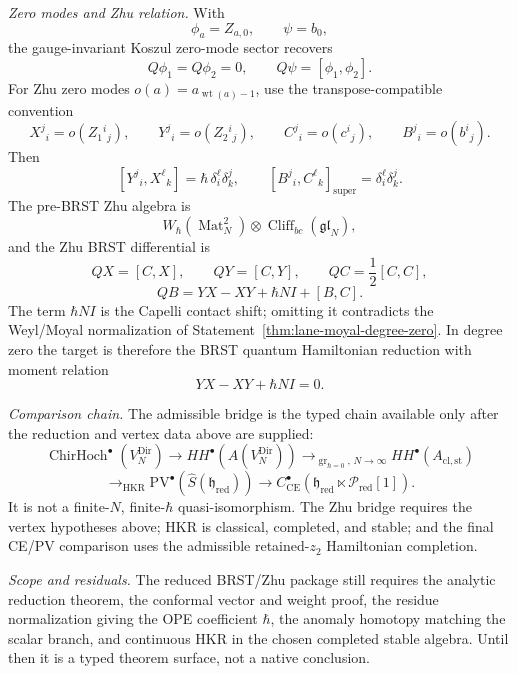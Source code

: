 \begin{stmt}
  \emph{Zero modes and Zhu relation.} With
  \[
    \phi_a=Z_{a,0},\qquad \psi=b_0,
  \]
  the gauge-invariant Koszul zero-mode sector recovers
  \[
    Q\phi_1=Q\phi_2=0,\qquad Q\psi=[\phi_1,\phi_2].
  \]
  For Zhu zero modes \(o(a)=a_{\operatorname{wt}(a)-1}\), use the
  transpose-compatible convention
  \[
    X^j{}_i=o(Z_1{}^i{}_j),\qquad
    Y^j{}_i=o(Z_2{}^i{}_j),\qquad
    C^j{}_i=o(c^i{}_j),\qquad
    B^j{}_i=o(b^i{}_j).
  \]
  Then
  \[
    [Y^j{}_i,X^\ell{}_k]
    =
    \hbar\,\delta^\ell_i\delta^j_k,\qquad
    [B^j{}_i,C^\ell{}_k]_{\mathrm{super}}
    =
    \delta^\ell_i\delta^j_k.
  \]
  The pre-BRST Zhu algebra is
  \[
    W_\hbar(\operatorname{Mat}_N^2)
    \otimes
    \operatorname{Cliff}_{bc}(\mathfrak{gl}_N),
  \]
  and the Zhu BRST differential is
  \[
    QX=[C,X],\qquad QY=[C,Y],\qquad
    QC=\frac12[C,C],
  \]
  \[
    QB=YX-XY+\hbar N I+[B,C].
  \]
  The term \(\hbar N I\) is the Capelli contact shift; omitting it
  contradicts the Weyl/Moyal normalization of
  Statement~\ref{thm:lane-moyal-degree-zero}.  In degree zero the target
  is therefore the BRST quantum Hamiltonian reduction with moment
  relation
  \[
    YX-XY+\hbar N I=0.
  \]

  \emph{Comparison chain.} The admissible bridge is the typed chain
  available only after the reduction and vertex data above are supplied:
  \[
    \operatorname{ChirHoch}^\bullet(V_N^{\mathrm{Dir}})
    \longrightarrow
    HH^\bullet(A(V_N^{\mathrm{Dir}}))
    \longrightarrow_{\operatorname{gr}_{\hbar=0},\,N\to\infty}
    HH^\bullet(A_{\mathrm{cl,st}})
  \]
  \[
    \longrightarrow_{\mathrm{HKR}}
    \mathrm{PV}^\bullet(\widehat S(\mathfrak h_{\mathrm{red}}))
    \longrightarrow
    C_{\mathrm{CE}}^\bullet
    (\mathfrak h_{\mathrm{red}}\ltimes\mathcal P_{\mathrm{red}}[1]).
  \]
  It is not a finite-\(N\), finite-\(\hbar\) quasi-isomorphism.  The Zhu
  bridge requires the vertex hypotheses above; HKR is classical,
  completed, and stable; and the final CE/PV comparison uses the
  admissible retained-\(z_2\) Hamiltonian completion.

  \emph{Scope and residuals.} The reduced BRST/Zhu package still requires
  the analytic reduction theorem, the conformal vector and weight proof,
  the residue normalization giving the OPE coefficient \(\hbar\), the
  anomaly homotopy matching the scalar branch, and continuous HKR in the
  chosen completed stable algebra.  Until then it is a typed theorem
  surface, not a native conclusion.
\end{stmt}

